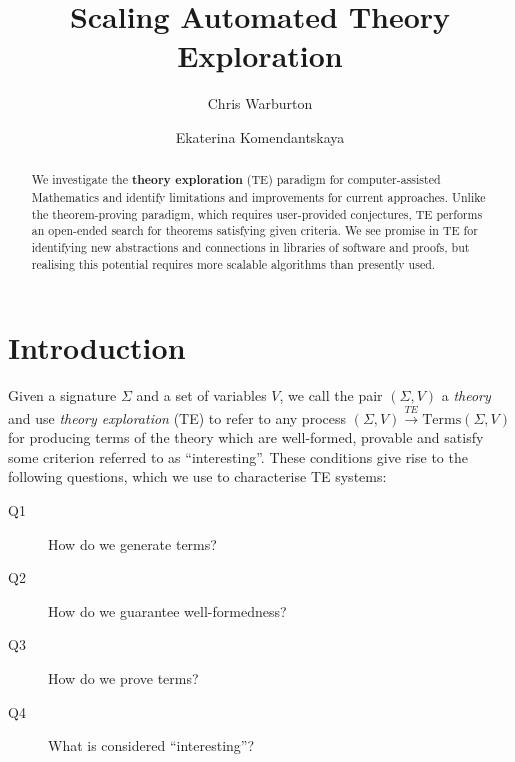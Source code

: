\documentclass{llncs}
\begin{document}
%
%
\pagestyle{headings}  %

\mainmatter              %
%
\title{Scaling Automated Theory Exploration}
%
%
\author{Chris Warburton \and Ekaterina Komendantskaya}
%
%
%

\maketitle              %

\begin{abstract}
We investigate the \textbf{theory exploration} (TE)
paradigm for computer-assisted Mathematics and identify limitations and
improvements for current approaches. Unlike the theorem-proving paradigm,
which requires user-provided conjectures, TE performs an open-ended
search for theorems satisfying given criteria. We see promise in TE for
identifying new abstractions and connections in libraries of software
and proofs, but realising this potential requires more scalable
algorithms than presently used.
\end{abstract}
%
\section{Introduction}

Given a signature $\Sigma$ and a set of variables $V$, we call the pair
$(\Sigma, V)$ a \emph{theory} and use \emph{theory exploration} (TE) to refer
to any process $(\Sigma, V) \overset{TE}{\rightarrow} \text{Terms}(\Sigma, V)$
for producing terms of the theory which are well-formed, provable and satisfy
some criterion referred to as ``interesting''. These conditions give rise to the
following questions, which we use to characterise TE systems:
\begin{description}
\item [Q1] \label{Q1} How do we generate terms?
\item [Q2] \label{Q2} How do we guarantee well-formedness?
\item [Q3] \label{Q3} How do we prove terms?
\item [Q4] \label{Q4} What is considered ``interesting''?
\end{description}
\end{document}
